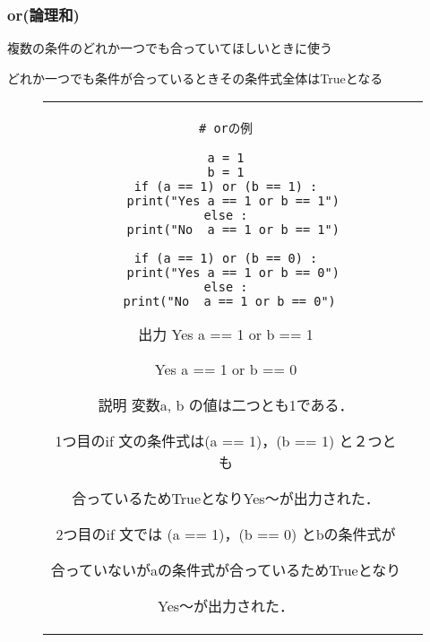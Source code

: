 \documentclass{jsarticle}
\begin{document}
\subsubsection{or(論理和)}
複数の条件のどれか一つでも合っていてほしいときに使う \par
どれか一つでも条件が合っているときその条件式全体はTrueとなる
\vspace{-5mm}
\begin{figure}[h]
	\begin{tabular}{cc}
		\begin{minipage}[t]{.4\textwidth}
			\begin{lstlisting}[caption=or]
# orの例

a = 1
b = 1
if (a == 1) or (b == 1) :
  print("Yes a == 1 or b == 1")
else :
  print("No  a == 1 or b == 1")

if (a == 1) or (b == 0) :
  print("Yes a == 1 or b == 0")
else :
  print("No  a == 1 or b == 0") \end{lstlisting}
		\end{minipage} \hspace{5mm}
		\begin{minipage}[t]{.6\textwidth}
			\begin{minipage}[t]{.5\textwidth}
				\begin{itembox}[l]{出力}
					Yes a == 1 or b == 1 \par
					Yes a == 1 or b == 0 \par
				\end{itembox}
			\end{minipage}
			\begin{itembox}[l]{説明}
				変数a, b の値は二つとも1である． \par
				1つ目のif 文の条件式は(a == 1)，(b == 1) と２つとも \par 合っているためTrueとなりYes～が出力された．\par
				2つ目のif 文では (a == 1)，(b == 0) とbの条件式が \par 合っていないがaの条件式が合っているためTrueとなり \par Yes～が出力された．
			\end{itembox}
		\end{minipage}
	\end{tabular}
\end{figure}

\end{document}
